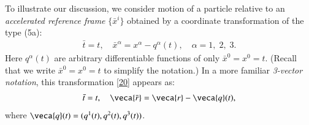 \documentclass[10pt]{article}
\begin{document}
To illustrate  our  discussion, we  consider motion of a 
particle relative to an  \textsl{accelerated reference 
frame} $\{\bar{x}^i\}$ obtained by  a
coordinate 
transformation of the type (5a): 
\begin{align}\label{20}
\bar{t}=t, \quad \bar{x}^\alpha
=x^\alpha - q^\alpha(t), \quad \alpha=1,\;2,\;3.
\end{align} 
Here  $q^\alpha (t)$ are arbitrary differentiable functions 
of only $\bar{x}^0=x^0=t$. (Recall that  we write  
$\bar{x}^0=x^0=t$ to simplify the notation.) In a more 
familiar \textsl{3-vector notation}, this transformation 
\eqref{20} 
appears as:
\begin{align}\label{21}
\bar{t}=t, \quad  {\veca{\bar{r}}}=\veca{r} - 
\veca{q}(t),
\end{align}
where $\veca{q}(t)=(q^1(t),q^2(t),q^3(t) )$.
\end{document}
